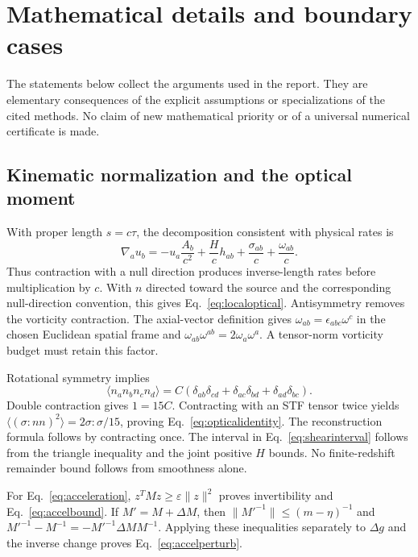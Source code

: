 \section{Mathematical details and boundary cases}
\label{app:math}

The statements below collect the arguments used in the report. They are elementary consequences of the explicit assumptions or specializations of the cited methods. No claim of new mathematical priority or of a universal numerical certificate is made.

\subsection{Kinematic normalization and the optical moment}

With proper length $s=c\tau$, the decomposition consistent with physical rates is
\begin{equation}
 \nabla_a u_b=-u_a\frac{A_b}{c^2}
 +\frac{H}{c}h_{ab}+\frac{\sigma_{ab}}{c}+\frac{\omega_{ab}}{c}.
\end{equation}
Thus contraction with a null direction produces inverse-length rates before multiplication by $c$. With $n$ directed toward the source and the corresponding null-direction convention, this gives Eq.~\eqref{eq:localoptical}. Antisymmetry removes the vorticity contraction. The axial-vector definition gives $\omega_{ab}=\epsilon_{abc}\omega^c$ in the chosen Euclidean spatial frame and $\omega_{ab}\omega^{ab}=2\omega_a\omega^a$. A tensor-norm vorticity budget must retain this factor.

Rotational symmetry implies
\begin{equation}
 \langle n_an_bn_cn_d\rangle
 =C(\delta_{ab}\delta_{cd}+\delta_{ac}\delta_{bd}+\delta_{ad}\delta_{bc}).
\end{equation}
Double contraction gives $1=15C$. Contracting with an STF tensor twice yields $\langle(\sigma:nn)^2\rangle=2\sigma:\sigma/15$, proving Eq.~\eqref{eq:opticalidentity}. The reconstruction formula follows by contracting once. The interval in Eq.~\eqref{eq:shearinterval} follows from the triangle inequality and the joint positive $H$ bounds. No finite-redshift remainder bound follows from smoothness alone.

For Eq.~\eqref{eq:acceleration}, $z^TMz\geq\varepsilon\|z\|^2$ proves invertibility and Eq.~\eqref{eq:accelbound}. If $M'=M+\Delta M$, then $\|M'^{-1}\|\leq(m-\eta)^{-1}$ and $M'^{-1}-M^{-1}=-M'^{-1}\Delta M M^{-1}$. Applying these inequalities separately to $\Delta g$ and the inverse change proves Eq.~\eqref{eq:accelperturb}.

